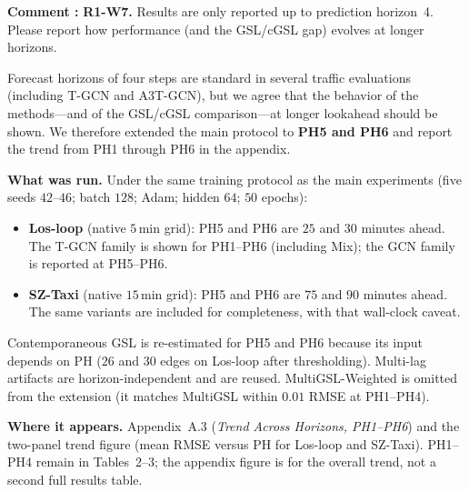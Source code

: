 \documentclass[a4paper,11pt]{article}
\newcounter{commentcounter}
\newcommand{\reviewercomment}[1]{%
    \stepcounter{commentcounter}%
    \begin{reviewerscomment}
        \textbf{Comment \arabic{commentcounter}:} #1
    \end{reviewerscomment}
}
\newcommand{\response}[1]{%
    \begin{myresponse}
        #1
    \end{myresponse}
    \vspace{5mm}
}
\begin{document}
\reviewercomment{
\textbf{R1-W7.} Results are only reported up to prediction horizon~4. Please report how performance (and the GSL/cGSL gap) evolves at longer horizons.
}

\response{
Forecast horizons of four steps are standard in several traffic evaluations (including T-GCN and A3T-GCN), but we agree that the behavior of the methods---and of the GSL/cGSL comparison---at longer lookahead should be shown. We therefore extended the main protocol to \textbf{PH5 and PH6} and report the trend from PH1 through PH6 in the appendix.

\textbf{What was run.} Under the same training protocol as the main experiments (five seeds $42$--$46$; batch $128$; Adam; hidden $64$; $50$ epochs):
\begin{itemize}
    \item \textbf{Los-loop} (native $5$\,min grid): PH5 and PH6 are $25$ and $30$ minutes ahead. The T-GCN family is shown for PH1--PH6 (including Mix); the GCN family is reported at PH5--PH6.
    \item \textbf{SZ-Taxi} (native $15$\,min grid): PH5 and PH6 are $75$ and $90$ minutes ahead. The same variants are included for completeness, with that wall-clock caveat.
\end{itemize}
Contemporaneous GSL is re-estimated for PH5 and PH6 because its input depends on $\mathrm{PH}$ ($26$ and $30$ edges on Los-loop after thresholding). Multi-lag artifacts are horizon-independent and are reused. MultiGSL-Weighted is omitted from the extension (it matches MultiGSL within $0.01$ RMSE at PH1--PH4).

\textbf{Where it appears.} Appendix~A.3 (\emph{Trend Across Horizons, PH1--PH6}) and the two-panel trend figure (mean RMSE versus PH for Los-loop and SZ-Taxi). PH1--PH4 remain in Tables~2--3; the appendix figure is for the overall trend, not a second full results table.

}
\end{document}
